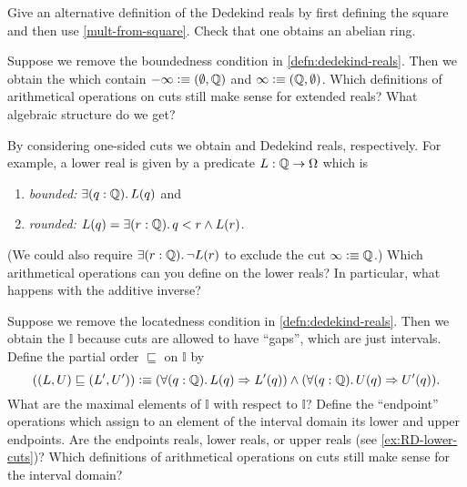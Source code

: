 \sectionExercises

\begin{ex}
 Give an alternative definition of the Dedekind reals by first defining the square and then use \autoref{mult-from-square}.
 Check that one obtains an abelian ring.
\end{ex}

\begin{ex} \label{ex:RD-extended-reals}
  Suppose we remove the boundedness condition in \autoref{defn:dedekind-reals}.
  Then we obtain the  which contain $-\infty \vcentcolon\equiv
  (\emptyset, \mathbb{Q})$ and $\infty \vcentcolon\equiv (\mathbb{Q}, \emptyset)$. Which definitions of arithmetical
  operations on cuts still make sense for extended reals? What algebraic structure do we
  get?
\end{ex}

\begin{ex} \label{ex:RD-lower-cuts}
  By considering one-sided cuts we obtain  and  Dedekind reals,
  respectively. For example, a lower real is given by a predicate $L : \mathbb{Q} \to \Omega$
  which is
  \begin{enumerate}
  \item \emph{bounded:} $\exis{q : \Q} L(q)$ and
  \item \emph{rounded:} $L(q) = \exis{r : \Q} q < r \land L(r)$.
  \end{enumerate}
  (We could also require $\exis{r : \Q} \lnot L(r)$ to exclude the cut $\infty \vcentcolon\equiv
  \mathbb{Q}$.) Which arithmetical operations can you define on the lower reals? In particular,
  what happens with the additive inverse?
\end{ex}

\begin{ex} \label{ex:RD-interval-arithmetic}
  Suppose we remove the locatedness condition in \autoref{defn:dedekind-reals}.
  Then we obtain the  $\mathbb{I}$ because cuts are allowed
  to have ``gaps'', which are just intervals. Define the partial order $\sqsubseteq$ on
  $\mathbb{I}$ by
  \begin{equation*}
    ((L, U) \sqsubseteq (L', U'))
    \defeq
    (\fall{q : \Q} L(q) \Rightarrow L'(q)) \land
    (\fall{q : \Q} U(q) \Rightarrow U'(q)).
  \end{equation*}
  What are the maximal elements of $\mathbb{I}$ with respect to $\mathbb{I}$? Define the
  ``endpoint'' operations which assign to an element of the interval domain its lower and
  upper endpoints. Are the endpoints reals, lower reals, or upper reals (see
  \autoref{ex:RD-lower-cuts})? Which definitions of arithmetical operations on cuts still
  make sense for the interval domain?
\end{ex}

